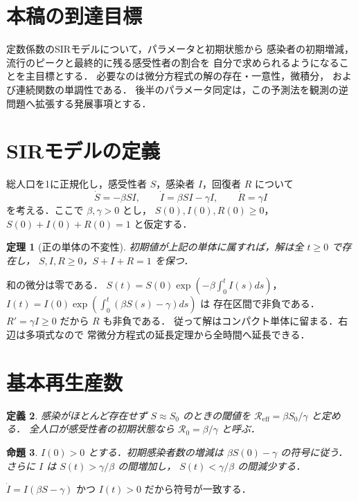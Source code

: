 \documentclass[a5paper,10pt,onecolumn]{jsarticle}
\makeatletter
\theoremstyle{mathnotetheorem}
\newtheorem{theorem}{定理}[section]
\newtheorem{definition}[theorem]{定義}
\newtheorem{proposition}[theorem]{命題}
\renewcommand{\proofname}{証明}
\renewenvironment{proof}[1][\proofname]{%
  \par\pushQED{\qed}\normalfont\topsep4\p@\@plus2\p@\relax
  \trivlist\item[\hskip\labelsep\bfseries #1]\ignorespaces
}{\popQED\endtrivlist\@endpefalse}
\makeatother
\begin{document}
\section*{本稿の到達目標}
定数係数のSIRモデルについて，パラメータと初期状態から
感染者の初期増減，流行のピークと最終的に残る感受性者の割合を
自分で求められるようになることを主目標とする．
必要なのは微分方程式の解の存在・一意性，微積分，
および連続関数の単調性である．
後半のパラメータ同定は，この予測法を観測の逆問題へ拡張する発展事項とする．

\section{SIRモデルの定義}
総人口を1に正規化し，感受性者 $S$，感染者 $I$，回復者 $R$ について
\[
 \dot S=-\beta SI,\qquad
 \dot I=\beta SI-\gamma I,\qquad
 \dot R=\gamma I
\]
を考える．ここで $\beta,\gamma>0$ とし，
$S(0),I(0),R(0)\ge0$，$S(0)+I(0)+R(0)=1$ と仮定する．
\begin{theorem}[正の単体の不変性]
初期値が上記の単体に属すれば，解は全 $t\ge0$ で存在し，
$S,I,R\ge0$，$S+I+R=1$ を保つ．
\end{theorem}
\begin{proof}
和の微分は零である．
$S(t)=S(0)\exp(-\beta\int_0^t I(s)ds)$，
$I(t)=I(0)\exp(\int_0^t(\beta S(s)-\gamma)ds)$ は
存在区間で非負である．$R'=\gamma I\ge0$ だから $R$ も非負である．
従って解はコンパクト単体に留まる．右辺は多項式なので
常微分方程式の延長定理から全時間へ延長できる．
\end{proof}
\section{基本再生産数}
\begin{definition}
感染がほとんど存在せず $S\approx S_0$ のときの閾値を
$\mathcal R_{\mathrm{eff}}=\beta S_0/\gamma$ と定める．
全人口が感受性者の初期状態なら $\mathcal R_0=\beta/\gamma$ と呼ぶ．
\end{definition}
\begin{proposition}
$I(0)>0$ とする．初期感染者数の増減は
$\beta S(0)-\gamma$ の符号に従う．
さらに $I$ は $S(t)>\gamma/\beta$ の間増加し，
$S(t)<\gamma/\beta$ の間減少する．
\end{proposition}
\begin{proof}
$\dot I=I(\beta S-\gamma)$ かつ $I(t)>0$ だから符号が一致する．
\end{proof}
\end{document}
